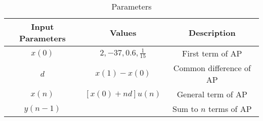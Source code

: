 \begin{table}[htbp]
    \centering
    \begin{tabular}{|c|c|c|} \hline
      \textbf{Input Parameters} & \textbf{Values} & \textbf{Description} \\ \hline
      $x(0)$ & $2, -37, 0.6, \frac{1}{15}$ & First term of AP \\ \hline
      $d$ & $x(1)-x(0)$ & Common difference of AP \\ \hline
      $x(n)$ & $[x(0)+nd]u(n)$ & General term of AP \\ \hline
      $y(n-1)$ & & Sum to $n$ terms of AP \\ \hline
    \end{tabular}
    \vspace{3pt}
    \caption{Parameters}
\end{table}
